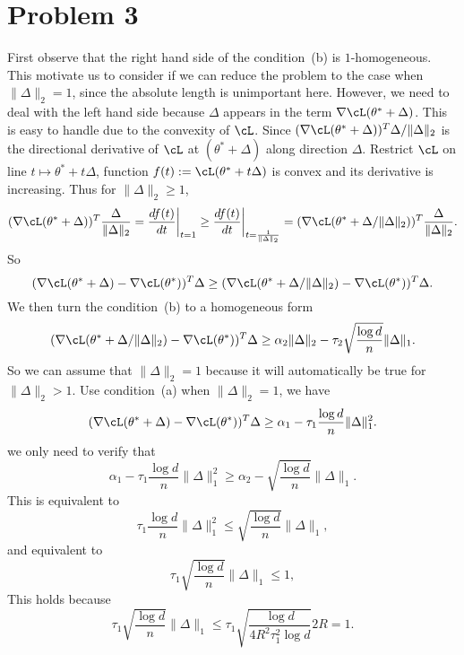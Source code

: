 \clearpage
\section{Problem 3}

First observe that the right hand side of the condition~(b)
is $1$-homogeneous.
This motivate us to consider if we can reduce the problem to
the case when $\|\Delta\|_2=1$,
since the absolute length is unimportant here.
However,
we need to deal with the left hand side
because $\Delta$ appears in the term $\nabla\cL(\theta^*+\Delta)$.
This is easy to handle due to the convexity of $\cL$.
Since $(\nabla\cL(\theta^*+\Delta))^T\Delta/\|\Delta\|_2$ is
the directional derivative of $\cL$ at $(\theta^*+\Delta)$
along direction $\Delta$.
Restrict $\cL$ on line $t\mapsto\theta^*+t\Delta$,
function $f(t):=\cL(\theta^*+t\Delta)$ is convex
and its derivative is increasing.
Thus for $\|\Delta\|_2\ge1$,
\begin{equation}
    (\nabla\cL(\theta^*+\Delta))^T\frac{\Delta}{\|\Delta\|_2} =
        \frac{df(t)}{dt}\bigg|_{t=1}
    \ge \frac{df(t)}{dt}\bigg|_{t=\frac{1}{\|\Delta\|_2}}
    =(\nabla\cL(\theta^*+\Delta/\|\Delta\|_2))^T\frac{\Delta}{\|\Delta\|_2}.
\end{equation}
So
\begin{equation}
    (\nabla\cL(\theta^*+\Delta)-\nabla\cL(\theta^*))^T\Delta
        \ge(\nabla\cL(\theta^*+\Delta/\|\Delta\|_2)-\nabla\cL(\theta^*))^T\Delta.
\end{equation}
We then turn the condition~(b) to a homogeneous form
\begin{equation}
    (\nabla\cL(\theta^*+\Delta/\|\Delta\|_2)-\nabla\cL(\theta^*))^T\Delta
        \ge\alpha_2\|\Delta\|_2-\tau_2\sqrt{\frac{\log d}{n}}\|\Delta\|_1.
\end{equation}
So we can assume that $\|\Delta\|_2=1$
because it will automatically be true for $\|\Delta\|_2>1$.
Use condition~(a) when $\|\Delta\|_2=1$,
we have
\begin{equation}
    (\nabla\cL(\theta^*+\Delta)-\nabla\cL(\theta^*))^T\Delta
        \ge\alpha_1-\tau_1\frac{\log d}{n}\|\Delta\|_1^2.
\end{equation}
we only need to verify that
\begin{equation}
    \alpha_1-\tau_1\frac{\log d}{n}\|\Delta\|_1^2
        \ge\alpha_2-\sqrt{\frac{\log d}{n}}\|\Delta\|_1.
\end{equation}
This is equivalent to
\begin{equation}
    \tau_1\frac{\log d}{n}\|\Delta\|_1^2
        \le\sqrt{\frac{\log d}{n}}\|\Delta\|_1,
\end{equation}
and equivalent to
\begin{equation}
    \tau_1\sqrt{\frac{\log d}{n}}\|\Delta\|_1
        \le1,
\end{equation}
This holds because
\begin{equation}
    \tau_1\sqrt{\frac{\log d}{n}}\|\Delta\|_1
        \le\tau_1\sqrt{\frac{\log d}{4R^2\tau_1^2\log d}}2R
        =1.
\end{equation}
